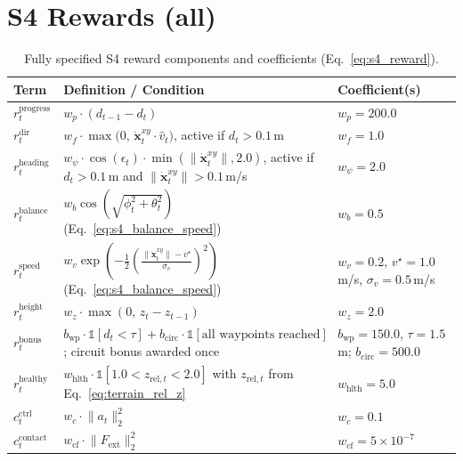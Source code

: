 \documentclass[conference]{IEEEtran}
\begin{document}
\section{S4 Rewards (all)}\label{app:s4}

\begin{table}[t]
\caption{Fully specified S4 reward components and coefficients (Eq.~\ref{eq:s4_reward}).}
\label{tab:s4_reward}
\centering
\small
\renewcommand{\arraystretch}{1.3}
\begin{tabular}{@{}p{2.2cm}p{9.2cm}p{4.2cm}@{}}
\toprule
\textbf{Term} & \textbf{Definition / Condition} & \textbf{Coefficient(s)} \\
\midrule
$r_t^{\mathrm{progress}}$ & $w_p \cdot (d_{t-1} - d_t)$ & $w_p = 200.0$ \\[2pt]
$r_t^{\mathrm{dir}}$ & $w_f \cdot \max\!\big(0,\, \dot{\mathbf{x}}_t^{xy} \!\cdot\! \hat{v}_t\big)$, active if $d_t > 0.1\,$m & $w_f = 1.0$ \\[2pt]
$r_t^{\mathrm{heading}}$ & $w_\psi \cdot \cos(\epsilon_t)\cdot\min(\|\dot{\mathbf{x}}_t^{xy}\|, 2.0)$, active if $d_t > 0.1\,$m and $\|\dot{\mathbf{x}}_t^{xy}\| > 0.1\,$m/s & $w_\psi = 2.0$ \\[2pt]
$r_t^{\mathrm{balance}}$ & $w_b \cos\!\left(\sqrt{\phi_t^2 + \theta_t^2}\right)$ (Eq.~\ref{eq:s4_balance_speed}) & $w_b = 0.5$ \\[2pt]
$r_t^{\mathrm{speed}}$ & $w_v \exp\!\left(-\tfrac{1}{2}\left(\tfrac{\|\dot{\mathbf{x}}_t^{xy}\| - v^\star}{\sigma_v}\right)^2\right)$ (Eq.~\ref{eq:s4_balance_speed}) & $w_v = 0.2$, $v^\star = 1.0\,$m/s, $\sigma_v = 0.5\,$m/s \\[2pt]
$r_t^{\mathrm{height}}$ & $w_z \cdot \max(0,\, z_t - z_{t-1})$ & $w_z = 2.0$ \\[2pt]
$r_t^{\mathrm{bonus}}$ & $b_{\mathrm{wp}}\cdot\mathbb{1}[d_t<\tau] + b_{\mathrm{circ}}\cdot\mathbb{1}[\text{all waypoints reached}]$; circuit bonus awarded once & $b_{\mathrm{wp}} = 150.0$, $\tau = 1.5\,$m; $b_{\mathrm{circ}} = 500.0$ \\[2pt]
$r_t^{\mathrm{healthy}}$ & $w_{\mathrm{hlth}} \cdot \mathbb{1}[1.0 < z_{\mathrm{rel},t} < 2.0]$ with $z_{\mathrm{rel},t}$ from Eq.~\ref{eq:terrain_rel_z} & $w_{\mathrm{hlth}} = 5.0$ \\[2pt]
$c_t^{\mathrm{ctrl}}$ & $w_c \cdot \lVert a_t \rVert_2^2$ & $w_c = 0.1$ \\[2pt]
$c_t^{\mathrm{contact}}$ & $w_{\mathrm{cf}} \cdot \lVert F_{\mathrm{ext}} \rVert_2^2$ & $w_{\mathrm{cf}} = 5 \!\times\! 10^{-7}$ \\

\end{tabular}
\end{table}
\end{document}
